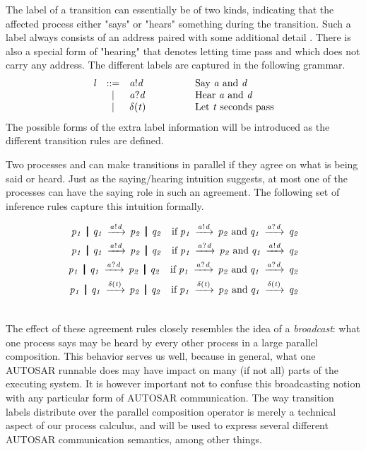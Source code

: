 \documentclass[twocolumn]{article}
\begin{document}
The label  of a transition can essentially be of two kinds, indicating that the affected process either "says" or "hears" something during the transition. Such a label always consists of an address  paired with some additional detail . There is also a special form of "hearing" that denotes letting time pass and which does not carry any address. The different labels are captured in the following grammar. 
\[
\begin{array}{rcll}
  \V{L}     & ::= & \V{A}!\V{D} 	& \hspace{4em}\text{Say  \V{A} and \V{D}} \\
            & |   & \V{A}?\V{D} 	& \hspace{4em}\text{Hear \V{A} and \V{D}} \\
            & |   & \Tdelta{\V{T}}	& \hspace{4em}\text{Let \V{T} seconds pass} \\
\end{array}
\]
The possible forms of the extra label information  will be introduced as the different transition rules are defined.

Two processes  and  can make transitions in parallel if they agree on what is being said or heard. Just as the saying/hearing intuition suggests, at most one of the processes can have the saying role in such an agreement. The following set of inference rules capture this intuition formally.
{
\renewcommand{\Prule}[2]{#1 \quad \Pif\; #2\\}
\renewcommand{\Tstep}[3]{#1 \red{#2} #3}
\renewcommand\Pcomma{\;\text{and}\;}

\begin{eqnarray}  \CombRed  \notag \end{eqnarray}
}


The effect of these agreement rules closely resembles the idea of a \emph{broadcast}: what one process says may be heard by every other process in a large parallel composition. This behavior serves us well, because in general, what one AUTOSAR runnable does may have impact on many (if not all) parts of the executing system. It is however important not to confuse this broadcasting notion with any particular form of AUTOSAR communication. The way transition labels distribute over the parallel composition operator is merely a technical aspect of our process calculus, and will be used to express several different AUTOSAR communication semantics, among other things.
\end{document}
